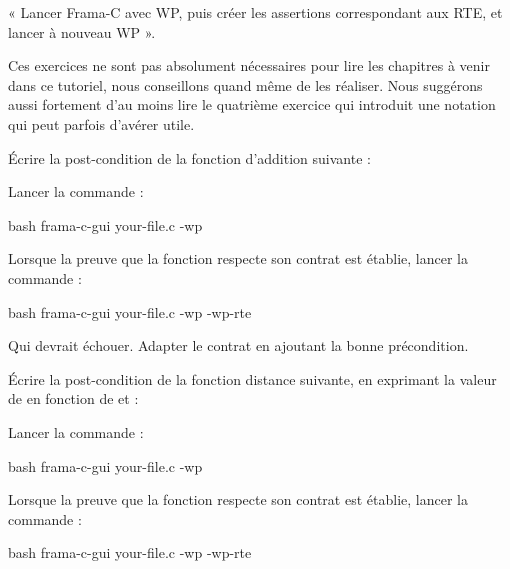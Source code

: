 


« Lancer Frama-C avec WP, puis créer les assertions correspondant aux RTE, et 
lancer à nouveau WP ».




Ces exercices ne sont pas absolument nécessaires pour lire les chapitres à
venir dans ce tutoriel, nous conseillons quand même de les réaliser. Nous
suggérons aussi fortement d'au moins lire le quatrième exercice qui introduit
une notation qui peut parfois d'avérer utile.




Écrire la post-condition de la fonction d'addition suivante :




Lancer la commande :

\begin{CodeBlock}{bash}
frama-c-gui your-file.c -wp
\end{CodeBlock}


Lorsque la preuve que la fonction respecte son contrat est établie, lancer
la commande :

\begin{CodeBlock}{bash}
frama-c-gui your-file.c -wp -wp-rte
\end{CodeBlock}


Qui devrait échouer. Adapter le contrat en ajoutant la bonne précondition.




Écrire la post-condition de la fonction distance suivante, en exprimant
la valeur de  en fonction de  et
 :




Lancer la commande :


\begin{CodeBlock}{bash}
frama-c-gui your-file.c -wp
\end{CodeBlock}


Lorsque la preuve que la fonction respecte son contrat est établie, lancer
la commande :

\begin{CodeBlock}{bash}
frama-c-gui your-file.c -wp -wp-rte
\end{CodeBlock}


